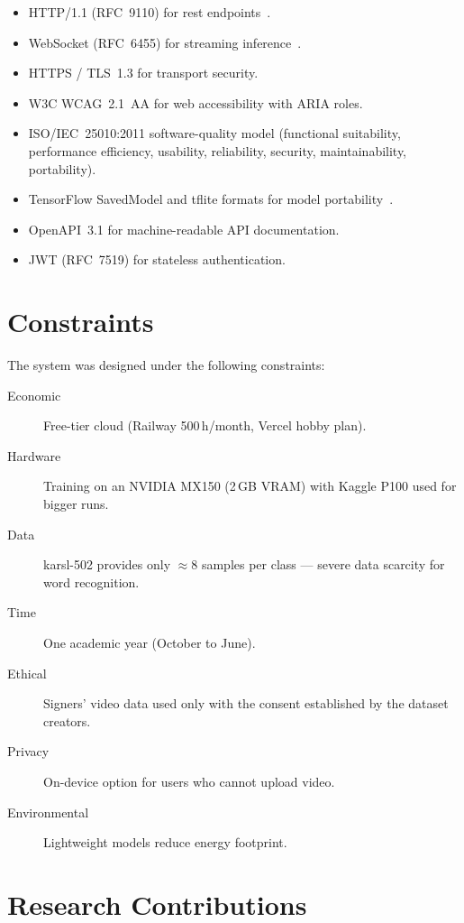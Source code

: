 \begin{itemize}
  \item HTTP/1.1 (RFC~9110) for \gls{rest} endpoints~\cite{rfc9110}.
  \item WebSocket (RFC~6455) for streaming inference~\cite{rfc6455}.
  \item HTTPS / TLS~1.3 for transport security.
  \item W3C WCAG~2.1~AA for web accessibility with ARIA roles.
  \item ISO/IEC~25010:2011 software-quality model
        (functional suitability, performance efficiency, usability,
        reliability, security, maintainability, portability).
  \item TensorFlow SavedModel and \gls{tflite} formats for model
        portability~\cite{tflite}.
  \item OpenAPI~3.1 for machine-readable API documentation.
  \item JWT (RFC~7519) for stateless authentication.
\end{itemize}

\section{Constraints}
\label{sec:intro:constraints}

The system was designed under the following constraints:

\begin{description}
  \item[Economic] Free-tier cloud (Railway 500\,h/month, Vercel hobby plan).
  \item[Hardware] Training on an NVIDIA MX150 (2\,GB VRAM) with Kaggle P100
        used for bigger runs.
  \item[Data] \gls{karsl}-502 provides only $\approx 8$ samples per class
        --- severe data scarcity for word recognition.
  \item[Time] One academic year (October to June).
  \item[Ethical] Signers' video data used only with the consent established
        by the dataset creators.
  \item[Privacy] On-device option for users who cannot upload video.
  \item[Environmental] Lightweight models reduce energy footprint.
\end{description}

\section{Research Contributions}
\label{sec:intro:contributions}

